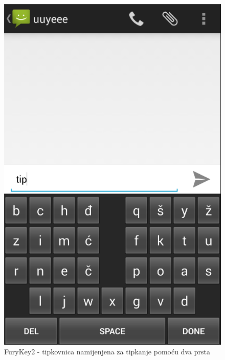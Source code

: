 \documentclass[times, utf8, zavrsni, numeric]{fer}
\begin{document}
\begin{figure}[htb]
\begin{minipage}[b]{0.40\textwidth}
    \includegraphics[width=\textwidth]{img/FuryKey2.PNG}
    \caption{FuryKey2 - tipkovnica namijenjena za tipkanje pomoću dva prsta}
    \label{fig:FuryKey2}
  \end{minipage}
\end{figure}
\end{document}
